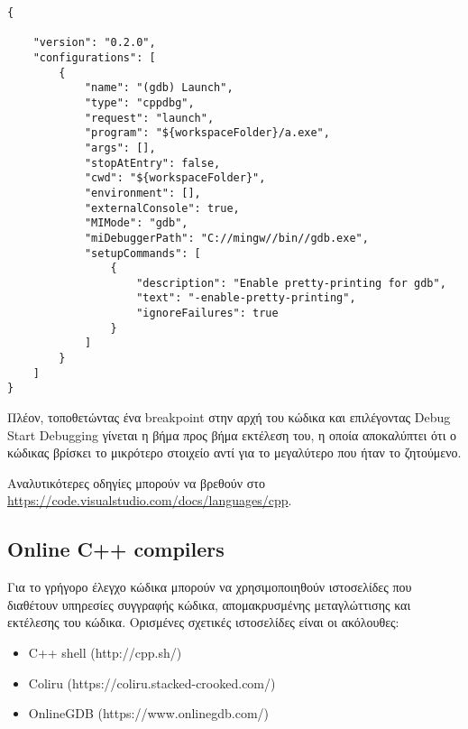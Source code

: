 \begin{enumerate}
\begin{lstlisting}[style=DOS,caption=launch.json]
{

    "version": "0.2.0",
    "configurations": [
        {
            "name": "(gdb) Launch",
            "type": "cppdbg",
            "request": "launch",
            "program": "${workspaceFolder}/a.exe",
            "args": [],
            "stopAtEntry": false,
            "cwd": "${workspaceFolder}",
            "environment": [],
            "externalConsole": true,
            "MIMode": "gdb",
            "miDebuggerPath": "C://mingw//bin//gdb.exe",
            "setupCommands": [
                {
                    "description": "Enable pretty-printing for gdb",
                    "text": "-enable-pretty-printing",
                    "ignoreFailures": true
                }
            ]
        }
    ]
}
\end{lstlisting}

Πλέον, τοποθετώντας ένα breakpoint στην αρχή του κώδικα και επιλέγοντας Debug \textrightarrow Start Debugging γίνεται η βήμα προς βήμα εκτέλεση του, η οποία αποκαλύπτει ότι ο κώδικας βρίσκει το μικρότερο στοιχείο αντί για το μεγαλύτερο που ήταν το ζητούμενο. 

\end{enumerate}

Αναλυτικότερες οδηγίες μπορούν να βρεθούν στο \href{https://code.visualstudio.com/docs/languages/cpp}{https://code.visualstudio.com/docs/languages/cpp}.

%

\subsection*{Online C++ compilers}
Για το γρήγορο έλεγχο κώδικα μπορούν να χρησιμοποιηθούν ιστοσελίδες που διαθέτουν υπηρεσίες συγγραφής κώδικα, απομακρυσμένης μεταγλώττισης και εκτέλεσης του κώδικα. Ορισμένες σχετικές ιστοσελίδες είναι οι ακόλουθες:
\begin{itemize}[nolistsep]
\item C++ shell (http://cpp.sh/)
\item Coliru (https://coliru.stacked-crooked.com/)
\item OnlineGDB (https://www.onlinegdb.com/)
\end{itemize}  


